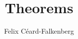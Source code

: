 \documentclass{article}
\title{Theorems}
\author{Felix Céard-Falkenberg}
\begin{document}
\maketitle



\newenvironment{task}
{%
  \begin{tcolorbox}[width=\textwidth,
                    colback=mintbg,
                    title=What should we do in this section?,
                    outer arc=0mm,
                    colupper=black]%
}%
{%
  \end{tcolorbox}%
}



% 

% 
% 
% 
\end{document}
